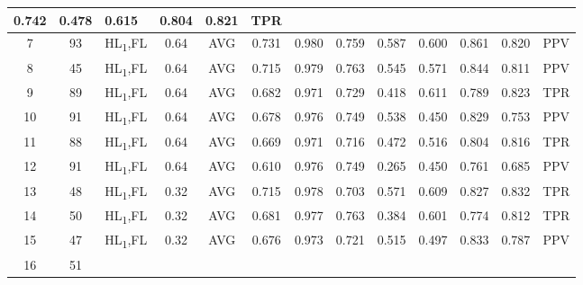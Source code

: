 \begin{table}[H]
{\begin{tabular}{cclc|c|c|c|c|c|c|c|c|c|}
    0.742 &
    0.478 &
    0.615 &
    0.804 &
    0.821 &
    TPR \\ \hline
  \multicolumn{1}{|c|}{7} &
    \multicolumn{1}{c|}{93} &
    \multicolumn{1}{l|}{HL\textsubscript{1},FL} &
    0.64 &
    AVG &
    0.731 &
    0.980 &
    0.759 &
    0.587 &
    0.600 &
    0.861 &
    0.820 &
    PPV \\ \hline
  \multicolumn{1}{|c|}{8} &
    \multicolumn{1}{c|}{45} &
    \multicolumn{1}{l|}{HL\textsubscript{1},FL} &
    0.64 &
    AVG &
    0.715 &
    0.979 &
    0.763 &
    0.545 &
    0.571 &
    0.844 &
    0.811 &
    PPV \\ \hline
  \multicolumn{1}{|c|}{9} &
    \multicolumn{1}{c|}{89} &
    \multicolumn{1}{l|}{HL\textsubscript{1},FL} &
    0.64 &
    AVG &
    0.682 &
    0.971 &
    0.729 &
    0.418 &
    0.611 &
    0.789 &
    0.823 &
    TPR \\ \hline
  \multicolumn{1}{|c|}{10} &
    \multicolumn{1}{c|}{91} &
    \multicolumn{1}{l|}{HL\textsubscript{1},FL} &
    0.64 &
    AVG &
    0.678 &
    0.976 &
    0.749 &
    0.538 &
    0.450 &
    0.829 &
    0.753 &
    PPV \\ \hline
  \multicolumn{1}{|c|}{11} &
    \multicolumn{1}{c|}{88} &
    \multicolumn{1}{l|}{HL\textsubscript{1},FL} &
    0.64 &
    AVG &
    0.669 &
    0.971 &
    0.716 &
    0.472 &
    0.516 &
    0.804 &
    0.816 &
    TPR \\ \hline
  \multicolumn{1}{|c|}{12} &
    \multicolumn{1}{c|}{91} &
    \multicolumn{1}{l|}{HL\textsubscript{1},FL} &
    0.64 &
    AVG &
    0.610 &
    0.976 &
    0.749 &
    0.265 &
    0.450 &
    0.761 &
    0.685 &
    PPV \\ \hline
  \multicolumn{1}{|c|}{13} &
    \multicolumn{1}{c|}{48} &
    \multicolumn{1}{l|}{HL\textsubscript{1},FL} &
    0.32 &
    AVG &
    0.715 &
    0.978 &
    0.703 &
    0.571 &
    0.609 &
    0.827 &
    0.832 &
    TPR \\ \hline
  \multicolumn{1}{|c|}{14} &
    \multicolumn{1}{c|}{50} &
    \multicolumn{1}{l|}{HL\textsubscript{1},FL} &
    0.32 &
    AVG &
    0.681 &
    0.977 &
    0.763 &
    0.384 &
    0.601 &
    0.774 &
    0.812 &
    TPR \\ \hline
  \multicolumn{1}{|c|}{15} &
    \multicolumn{1}{c|}{47} &
    \multicolumn{1}{l|}{HL\textsubscript{1},FL} &
    0.32 &
    AVG &
    0.676 &
    0.973 &
    0.721 &
    0.515 &
    0.497 &
    0.833 &
    0.787 &
    PPV \\ \hline
  \multicolumn{1}{|c|}{16} &
    \multicolumn{1}{c|}{51} &

\end{tabular}}
\end{table}
